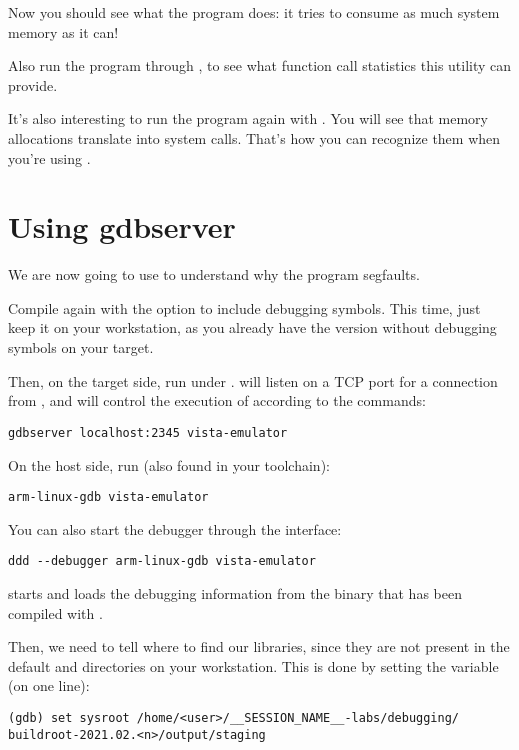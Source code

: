 Now you should see what the program does: it tries to consume as much
system memory as it can!

Also run the program through , to see what function call
statistics this utility can provide.

It's also interesting to run the program again with . You
will see that memory allocations translate into  system
calls. That's how you can recognize them when you're using
.

\section{Using gdbserver}

We are now going to use  to understand why the program
segfaults.

Compile  again with the  option to
include debugging symbols. This time, just keep it on your workstation,
as you already have the version without debugging symbols on your target.

Then, on the target side, run  under
.  will listen on a TCP port for a
connection from , and will control the execution of
 according to the  commands:

\begin{verbatim}
gdbserver localhost:2345 vista-emulator
\end{verbatim}

On the host side, run  (also found in your toolchain):
\begin{verbatim}
arm-linux-gdb vista-emulator
\end{verbatim}

You can also start the debugger through the  interface:
\begin{verbatim}
ddd --debugger arm-linux-gdb vista-emulator
\end{verbatim}

 starts and loads the debugging information from the
 binary that has been compiled with .

Then, we need to tell where to find our libraries, since they are not
present in the default  and  directories on
your workstation. This is done by setting the  
variable (on one line):

\begin{verbatim}
(gdb) set sysroot /home/<user>/__SESSION_NAME__-labs/debugging/
buildroot-2021.02.<n>/output/staging
\end{verbatim}

